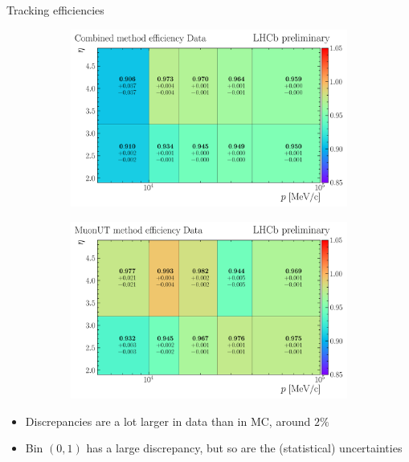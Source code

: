 \documentclass[xcolor={dvipsnames}]{beamer}
\begin{document}
\begin{frame}{Tracking efficiencies}
  \vspace{0.0cm}
  \begin{figure}[htb]
    \centering
    \begin{subfigure}{0.5\textwidth}
      \centering
      \includegraphics[width=1.0\textwidth]{Plots/trackEff_Data__2024_Block1_Combined_P-ETA.png}
    \end{subfigure}%
    \begin{subfigure}{0.5\textwidth}
      \centering
      \includegraphics[width=1.0\textwidth]{Plots/trackEff_Data__2024_Block1_MuonUT_P-ETA.png}
    \end{subfigure}
  \end{figure}
  \begin{itemize}
    \item{Discrepancies are a lot larger in data than in MC, around $2\%$}
    \item{Bin $(0, 1)$ has a large discrepancy, but so are the (statistical) uncertainties}
  \end{itemize}
\end{frame}
\end{document}
